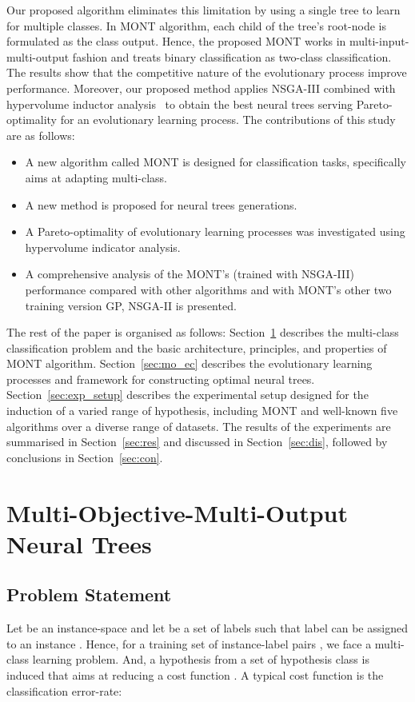 \documentclass[conference]{IEEEtran}
\begin{document}
Our proposed algorithm eliminates this limitation by using a single tree to learn for multiple classes. In MONT algorithm, each child of the tree's root-node is formulated as the class output. Hence, the proposed MONT works in multi-input-multi-output fashion and treats binary classification as two-class classification. The results show that the competitive nature of the evolutionary process improve performance. Moreover, our proposed method applies NSGA-III combined with hypervolume inductor analysis~\cite{fonseca2006improved} to obtain the best neural trees serving Pareto-optimality for an evolutionary learning process. The contributions of this study are as follows: \begin{itemize}
    \item A new algorithm called MONT is designed for classification tasks, specifically aims at adapting multi-class.
    \item A new method is proposed for neural trees generations.
    \item A Pareto-optimality of evolutionary learning processes was investigated using hypervolume indicator analysis. 
    \item A comprehensive analysis of the MONT's (trained with NSGA-III) performance compared with other algorithms and with MONT's other two training version GP, NSGA-II is presented.
\end{itemize}
The rest of the paper is organised as follows: Section~\ref{sec:mont} describes the multi-class classification problem and the basic architecture, principles, and properties of MONT algorithm. Section~\ref{sec:mo_ec} describes the evolutionary learning processes and framework for constructing optimal neural trees. Section~\ref{sec:exp_setup} describes the experimental setup designed for the induction of a varied range of hypothesis, including MONT and well-known five algorithms over a diverse range of datasets. The results of the experiments are summarised in Section~\ref{sec:res} and discussed in Section~\ref{sec:dis}, followed by conclusions in Section~\ref{sec:con}.
\section{Multi-Objective-Multi-Output Neural Trees}
\label{sec:mont}
\subsection{Problem Statement} \label{sec:problem_stmt}
Let  be an instance-space and let  be a set of  labels such that label  can be assigned to an instance . Hence, for a training set of instance-label pairs , we face a multi-class learning problem. And, a hypothesis  from a set of hypothesis class  is induced that aims at reducing a cost function . A typical cost function is the classification error-rate:
\end{document}
